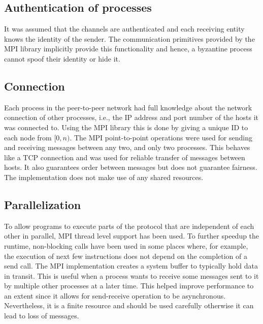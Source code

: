 \subsection{Authentication of processes}
It was assumed that the channels are authenticated and each receiving entity knows the identity of the sender. The communication primitives provided by the MPI library implicitly provide this functionality and hence, a byzantine process cannot spoof their identity or hide it.

\subsection{Connection}
Each process in the peer-to-peer network had full knowledge about the network connection of other processes, i.e., the IP address and port number of the hosts it was connected to. Using the MPI library this is done by giving a unique ID to each node from $[0, n)$. The MPI point-to-point operations were used for sending and receiving messages between any two, and only two processes. This behaves like a TCP connection and was used for reliable transfer of messages between hosts. It also guarantees order between messages but does not guarantee fairness. The implementation does not make use of any shared resources.

\subsection{Parallelization}
To allow programs to execute parts of the protocol that are independent of each other in parallel, MPI thread level support has been used. To further speedup the runtime, non-blocking calls have been used in some places where, for example, the execution of next few instructions does not depend on the completion of a send call. The MPI implementation creates a system buffer to typically hold data in transit. This is useful when a process wants to receive some messages sent to it by multiple other processes at a later time. This helped improve performance to an extent since it allows for send-receive operation to be asynchronous. Nevertheless, it is a finite resource and should be used carefully otherwise it can lead to loss of messages. 

